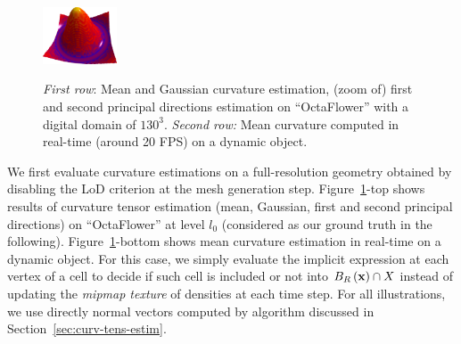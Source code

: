 \documentclass{llncs}
\begin{document}
\begin{figure}
\begin{center}
    {\includegraphics[width=2.2cm]{figs/function_mean_4}}
  \end{center}
  \vspace{-0.35cm}
  \caption{\emph{First row}: Mean and Gaussian curvature estimation, (zoom of) first and second principal directions estimation on ``OctaFlower'' with a digital domain of $130^3$.
  \emph{Second row:} Mean curvature computed in real-time (around 20 FPS) on a dynamic object.}
  \label{fig:full}
  \vspace{-0.35cm}
\end{figure}


We first evaluate curvature estimations on a full-resolution geometry
obtained by disabling the LoD criterion at the mesh generation step.
Figure~\ref{fig:full}-top shows results of curvature tensor estimation
(mean, Gaussian, first and second principal directions) on
``OctaFlower'' at level $l_0$ (considered as our ground truth in the
following).  Figure~\ref{fig:full}-bottom shows mean curvature
estimation in real-time on a dynamic object. For this case, we simply
evaluate the implicit expression at each vertex of a cell to decide if
such cell is included or not into $B_{R}\left(\mathbf{x}\right)\cap X$ instead
of updating the \emph{mipmap texture} of densities at each time
step. For all illustrations, we use directly normal vectors computed
by algorithm discussed in Section~\ref{sec:curv-tens-estim}.
\end{document}

